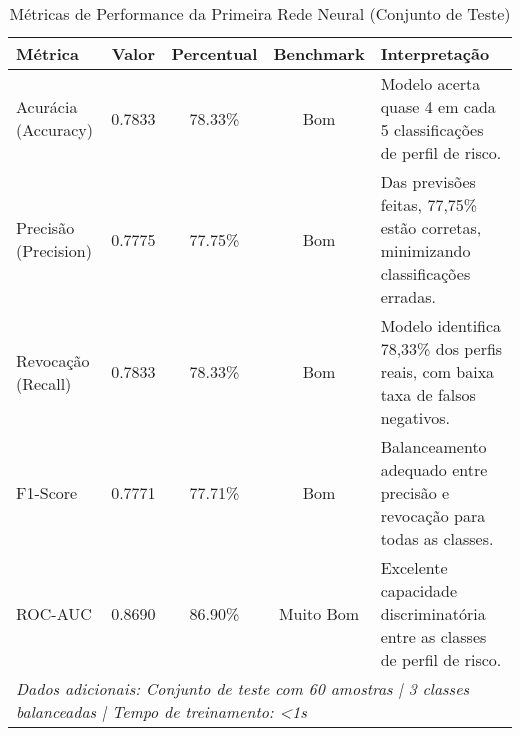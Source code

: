 \begin{table}[htbp]
\centering
\caption{Métricas de Performance da Primeira Rede Neural (Conjunto de Teste)}
\label{tab:metricas_rede1}
\small
\begin{tabular}{lcccp{6cm}}
\toprule
\textbf{Métrica} & \textbf{Valor} & \textbf{Percentual} & \textbf{Benchmark} & \textbf{Interpretação} \\
\midrule
Acurácia (Accuracy) & 0.7833 & 78.33\% & Bom & Modelo acerta quase 4 em cada 5 classificações de perfil de risco. \\
\addlinespace
Precisão (Precision) & 0.7775 & 77.75\% & Bom & Das previsões feitas, 77,75\% estão corretas, minimizando classificações erradas. \\
\addlinespace
Revocação (Recall) & 0.7833 & 78.33\% & Bom & Modelo identifica 78,33\% dos perfis reais, com baixa taxa de falsos negativos. \\
\addlinespace
F1-Score & 0.7771 & 77.71\% & Bom & Balanceamento adequado entre precisão e revocação para todas as classes. \\
\addlinespace
ROC-AUC & 0.8690 & 86.90\% & Muito Bom & Excelente capacidade discriminatória entre as classes de perfil de risco. \\
\midrule
\multicolumn{5}{l}{\textit{Dados adicionais: Conjunto de teste com 60 amostras | 3 classes balanceadas | Tempo de treinamento: <1s}} \\
\bottomrule
\end{tabular}
\end{table}